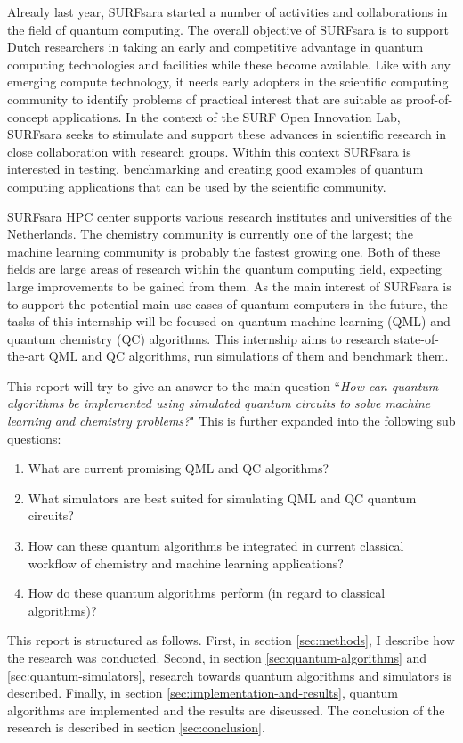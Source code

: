 \documentclass[a4paper,11pt]{article}
\begin{document}
Already last year, SURFsara started a number of activities and collaborations in the field of quantum computing.
The overall objective of SURFsara is to support Dutch researchers in taking an early and competitive advantage in quantum computing technologies and facilities while these become available.
Like with any  emerging compute technology, it needs early adopters in the scientific computing community to identify problems of practical interest that are suitable as proof-of-concept applications.
In the context of the SURF Open Innovation Lab, SURFsara seeks to stimulate and support these advances in scientific research in close collaboration with research groups.
Within this context SURFsara is interested in testing, benchmarking and creating good examples of quantum computing applications that can be used by the scientific community.

SURFsara HPC center supports various research institutes and universities of the Netherlands.
The chemistry community is currently one of the largest; the machine learning community is probably the fastest growing one.
Both of these fields are large areas of research within the quantum computing field, expecting large improvements to be gained from them.
As the main interest of SURFsara is to support the potential main use cases of quantum computers in the future, the tasks of this internship will be focused on quantum machine learning (QML) and quantum chemistry (QC) algorithms.
This internship aims to research state-of-the-art QML and QC algorithms, run simulations of them and benchmark them.

This report will try to give an answer to the main question ``\emph{How can quantum algorithms be implemented using simulated quantum circuits to solve machine learning and chemistry problems?}"
This is further expanded into the following sub questions:
\begin{enumerate}
	\item What are current promising QML and QC algorithms?
	\item What simulators are best suited for simulating QML and QC quantum circuits?
	\item How can these quantum algorithms be integrated in current classical workflow of chemistry and machine learning applications?
	\item How do these quantum algorithms perform (in regard to classical algorithms)?
\end{enumerate}

This report is structured as follows. First, in section \ref{sec:methods}, I describe how the research was conducted.
Second, in section \ref{sec:quantum-algorithms} and \ref{sec:quantum-simulators}, research towards quantum algorithms and simulators is described.
Finally, in section \ref{sec:implementation-and-results}, quantum algorithms are implemented and the results are discussed.
The conclusion of the research is described in section \ref{sec:conclusion}.
\end{document}
